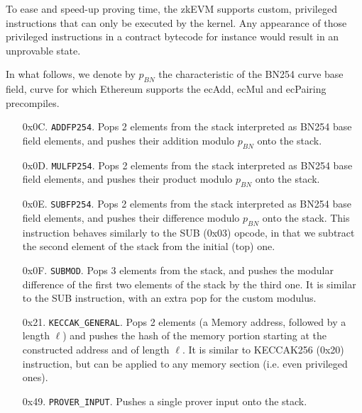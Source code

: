 To ease and speed-up proving time, the zkEVM supports custom, privileged instructions that can only be executed by the kernel.
Any appearance of those privileged instructions in a contract bytecode for instance would result in an unprovable state.

In what follows, we denote by $p_{BN}$ the characteristic of the BN254 curve base field, curve for which Ethereum supports the 
ecAdd, ecMul and ecPairing precompiles.

\begin{enumerate}[align=left]
  \item[0x0C.] \texttt{ADDFP254}. Pops 2 elements from the stack interpreted as BN254 base field elements, and pushes their addition modulo $p_{BN}$ onto the stack.

  \item[0x0D.] \texttt{MULFP254}. Pops 2 elements from the stack interpreted as BN254 base field elements, and pushes their product modulo $p_{BN}$ onto the stack.

  \item[0x0E.] \texttt{SUBFP254}. Pops 2 elements from the stack interpreted as BN254 base field elements, and pushes their difference modulo $p_{BN}$ onto the stack.
  This instruction behaves similarly to the SUB (0x03) opcode, in that we subtract the second element of the stack from the initial (top) one.

  \item[0x0F.] \texttt{SUBMOD}. Pops 3 elements from the stack, and pushes the modular difference of the first two elements of the stack by the third one.
  It is similar to the SUB instruction, with an extra pop for the custom modulus.

  \item[0x21.] \texttt{KECCAK\_GENERAL}. Pops 2 elements (a Memory address, followed by a length $\ell$) and pushes the hash of the memory portion starting at the
  constructed address and of length $\ell$. It is similar to KECCAK256 (0x20) instruction, but can be applied to any memory section (i.e. even privileged ones).

  \item[0x49.] \texttt{PROVER\_INPUT}. Pushes a single prover input onto the stack.


\end{enumerate}
